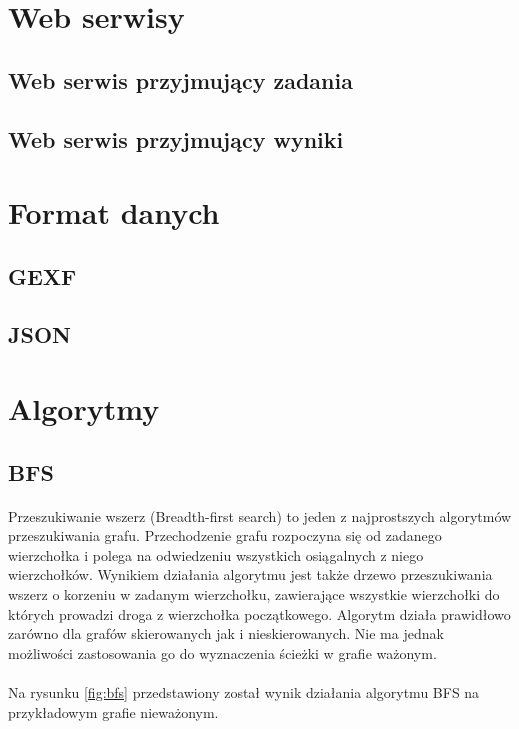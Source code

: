 \section{Web serwisy}
\label{sec:webservices}
\subsection{Web serwis przyjmujący zadania}

\subsection{Web serwis przyjmujący wyniki}

\section{Format danych}
\label{sec:data}

\subsection{GEXF}

\subsection{JSON}

\section{Algorytmy}

\subsection{BFS}
\paragraph{}
Przeszukiwanie wszerz (Breadth-first search) to jeden z najprostszych algorytmów przeszukiwania grafu. 
Przechodzenie grafu rozpoczyna się od zadanego wierzchołka i polega na odwiedzeniu wszystkich osiągalnych z niego wierzchołków. 
Wynikiem działania algorytmu jest także drzewo przeszukiwania wszerz o korzeniu w zadanym wierzchołku, zawierające wszystkie wierzchołki do których
prowadzi droga z wierzchołka początkowego. 
Algorytm działa prawidłowo zarówno dla grafów skierowanych jak i nieskierowanych.
Nie ma jednak możliwości zastosowania go do wyznaczenia ścieżki w grafie ważonym.

\paragraph{}
Na rysunku \ref{fig:bfs} przedstawiony został wynik działania algorytmu BFS na przykładowym grafie nieważonym.

